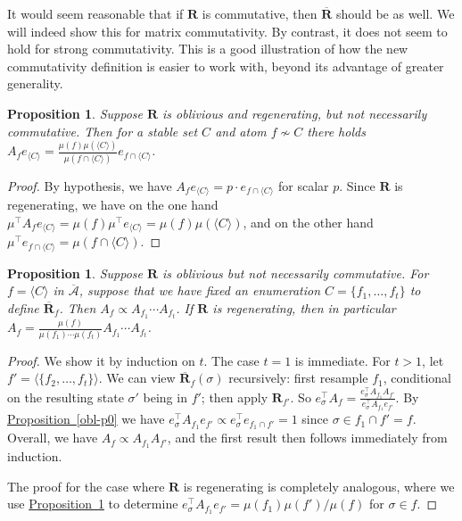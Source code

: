 \documentclass[11pt]{article}
\newcommand{\expref}[2]{\texorpdfstring{\hyperref[#2]{#1~\ref{#2}}}{#1~\ref{#2}}}
\newtheorem{proposition}[theorem]{Proposition}
\newcommand\oa{\overline{\mathcal A}}
\newcommand\obr{\overline{\mathbf R}}
\begin{document}
It would seem reasonable that if $\mathbf R$ is commutative, then $\obr$ should be as well.  We will indeed show this for matrix commutativity. By contrast, it does not seem to hold for strong commutativity. This is a good illustration of how the new commutativity definition is easier to work with, beyond its advantage of greater generality.

\begin{proposition}
\label{obl-p00}
Suppose $\mathbf R$ is oblivious and regenerating, but not necessarily commutative. Then for a stable set $C$ and atom $f \not \sim C$ there holds $A_f e_{\langle C \rangle} =\frac{\mu(f) \mu(\langle C \rangle)}{\mu(f \cap \langle C \rangle)} e_{f \cap \langle C \rangle}$.
\end{proposition}
\begin{proof}
By hypothesis, we have $A_f e_{\langle C \rangle} = p \cdot e_{f \cap \langle C \rangle}$ for scalar $p$. Since $\mathbf R$ is regenerating, we have on the one hand $\mu^{\top} A_f e_{\langle C \rangle} = \mu(f) \mu^{\top} e_{\langle C \rangle} = \mu(f) \mu(\langle C \rangle)$, and on the other hand $\mu^{\top} e_{f \cap \langle C \rangle} = \mu(f \cap \langle C \rangle)$.
\end{proof}
  
\begin{proposition}
  \label{obl-p1}
  Suppose $\mathbf R$ is oblivious but not necessarily commutative. For $f = \langle C \rangle$ in $\oa$, suppose that we have fixed an enumeration $C = \{f_1, \dots, f_t \}$ to define $\obr_f$.    Then $
  A_f \propto A_{f_1} \cdots A_{f_t}$. If $\mathbf R$ is regenerating, then in particular $ A_f = \frac{\mu(f) }{\mu(f_1) \cdots \mu(f_t)}  A_{f_1} \cdots A_{f_t}$.
\end{proposition}
\begin{proof} We show it by induction on $t$. The case $t = 1$ is immediate.   For $t > 1$, let $f' = \langle \{ f_2, \dots, f_t \} \rangle$. We can view $\obr_f(\sigma)$ recursively:  first resample $f_1$, conditional on the resulting state $\sigma'$ being in $f'$; then apply $\mathbf R_{f'}$. So $ e_{\sigma}^{\top} A_f = \frac{ e_{\sigma}^{\top} A_{f_1} A_{f'} }{e_{\sigma}^{\top} A_{f_1} e_{f'}}$. By \expref{Proposition}{obl-p0} we have $e_{\sigma}^{\top} A_{f_1} e_{f'} \propto e_{\sigma}^{\top} e_{f_1 \cap f'} = 1$ since $\sigma \in f_1 \cap f' = f$.  Overall, we have $A_f \propto A_{f_1} A_{f'}$, and the first result then follows immediately from induction.

The proof for the case where $\mathbf R$ is regenerating is completely analogous, where we use \expref{Proposition}{obl-p00} to determine $e_{\sigma}^{\top} A_{f_1} e_{f'} = \mu(f_1) \mu(f') / \mu(f)$ for $\sigma \in f$.
\end{proof}
\end{document}
